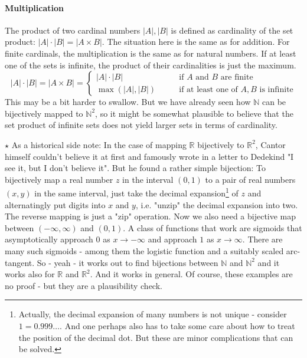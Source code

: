 

\paragraph{Multiplication} The product of two cardinal numbers $|A|,|B|$ is defined as cardinality of the set product: $|A| \cdot |B| = |A \times B|$. The situation here is the same as for addition. For finite cardinals, the multiplication is the same as for natural numbers. If at least one of the sets is infinite, the product of their cardinalities is just the maximum.
\begin{equation}
|A| \cdot |B| = |A \times B| =
\begin{cases}
|A| \cdot |B|    \qquad &\text{if $A$ and $B$ are finite} \\
\max(|A|,|B|)   \qquad &\text{if at least one of $A, B$ is infinite}
\end{cases}
\end{equation}
This may be a bit harder to swallow. But we have already seen how $\mathbb{N}$ can be bijectively mapped to $\mathbb{N}^2$, so it might be somewhat plausible to believe that the set product of infinite sets does not yield larger sets in terms of cardinality. 

\medskip
$\star$ As a historical side note: In the case of mapping $\mathbb{R}$ bijectively to $\mathbb{R}^2$, Cantor himself couldn't believe it at first and famously wrote in a letter to Dedekind "I see it, but I don't believe it". But he found a rather simple bijection: To bijectively map a real number $z$ in the interval $(0,1)$ to a pair of real numbers $(x,y)$ in the same interval, just take the decimal expansion\footnote{Actually, the decimal expansion of many numbers is not unique - consider $1 = 0.999\ldots$. And one perhaps also has to take some care about how to treat the position of the decimal dot. But these are minor complications that can be solved.} of $z$ and alternatingly put digits into $x$ and $y$, i.e. "unzip" the decimal expansion into two. The reverse mapping is just a "zip" operation. Now we also need a bijective map between $(-\infty, \infty)$ and $(0,1)$. A class of functions that work are sigmoids that asymptotically approach $0$ as $x \rightarrow -\infty$ and approach $1$ as $x \rightarrow \infty$. There are many such sigmoids - among them the logistic function and a suitably scaled arc-tangent. So - yeah - it works out to find bijections between $\mathbb{N}$ and $\mathbb{N}^2$ and it works also for  $\mathbb{R}$ and $\mathbb{R}^2$. And it works in general. Of course, these examples are no proof - but they are a plausibility check.


